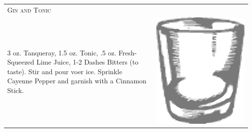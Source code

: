 \documentclass{article}
\begin{document}
\begin{multicols}{2}
\begin{tabular}{p{2in} p{0.5in}}
\multicolumn{2}{p{3in}}{\centering\Huge\textsc{Gin and Tonic}} \\ 
   \vspace{-0.1in}3 oz. Tanqueray, 1.5 oz. Tonic, .5 oz. Fresh-Squeezed Lime Juice, 1-2  Dashes Bitters (to taste). Stir and pour voer ice. Sprinkle Cayenne Pepper and garnish with a Cinnamon Stick. &
   \vspace{-0.1in} \includegraphics{rocks_glass.png}
\end{tabular}


\end{multicols}
\end{document}
